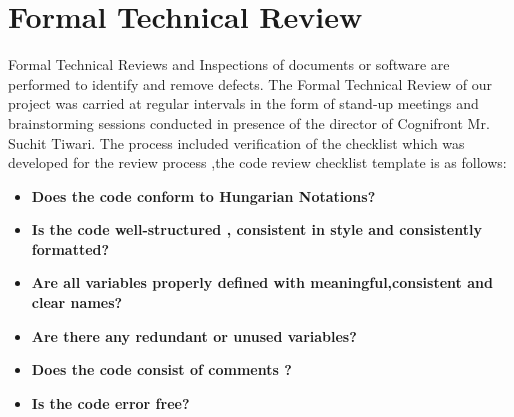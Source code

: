 \documentclass[openany,12pt]{report}
\begin{document}
\section{Formal Technical Review}
\hspace*{0.5in}Formal Technical Reviews and Inspections of documents or software are performed to identify and
remove defects. The Formal Technical Review of our project was carried at regular intervals in the form of stand-up meetings and brainstorming sessions conducted in presence of the director of Cognifront  Mr. Suchit Tiwari. The process included verification of the checklist which was developed for the review process ,the code review  checklist template is as follows:

\begin{itemize}
\item{\textbf{Does the code conform to Hungarian Notations?}}
\item{\textbf{Is the code well-structured , consistent in style and consistently formatted?}}
\item{\textbf{Are all variables properly defined with meaningful,consistent and clear names?}}
\item{\textbf{Are there any redundant or unused variables?}}
\item{\textbf{Does the code consist of comments ?}}
\item{\textbf{Is the code error free?}}

\end{itemize}
\end{document}
